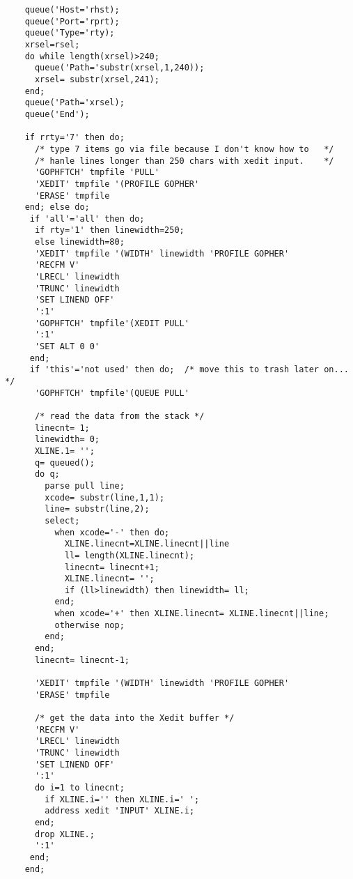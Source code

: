 \begin{verbatim}
    queue('Host='rhst);
    queue('Port='rprt);
    queue('Type='rty);
    xrsel=rsel;
    do while length(xrsel)>240;
      queue('Path='substr(xrsel,1,240));
      xrsel= substr(xrsel,241);
    end;
    queue('Path='xrsel);
    queue('End');

    if rrty='7' then do;
      /* type 7 items go via file because I don't know how to   */
      /* hanle lines longer than 250 chars with xedit input.    */
      'GOPHFTCH' tmpfile 'PULL'
      'XEDIT' tmpfile '(PROFILE GOPHER'
      'ERASE' tmpfile
    end; else do;
     if 'all'='all' then do;
      if rty='1' then linewidth=250;
      else linewidth=80;
      'XEDIT' tmpfile '(WIDTH' linewidth 'PROFILE GOPHER'
      'RECFM V'
      'LRECL' linewidth
      'TRUNC' linewidth
      'SET LINEND OFF'
      ':1'
      'GOPHFTCH' tmpfile'(XEDIT PULL'
      ':1'
      'SET ALT 0 0'
     end;
     if 'this'='not used' then do;  /* move this to trash later on... */
      'GOPHFTCH' tmpfile'(QUEUE PULL'

      /* read the data from the stack */
      linecnt= 1;
      linewidth= 0;
      XLINE.1= '';
      q= queued();
      do q;
        parse pull line;
        xcode= substr(line,1,1);
        line= substr(line,2);
        select;
          when xcode='-' then do;
            XLINE.linecnt=XLINE.linecnt||line
            ll= length(XLINE.linecnt);
            linecnt= linecnt+1;
            XLINE.linecnt= '';
            if (ll>linewidth) then linewidth= ll;
          end;
          when xcode='+' then XLINE.linecnt= XLINE.linecnt||line;
          otherwise nop;
        end;
      end;
      linecnt= linecnt-1;

      'XEDIT' tmpfile '(WIDTH' linewidth 'PROFILE GOPHER'
      'ERASE' tmpfile

      /* get the data into the Xedit buffer */
      'RECFM V'
      'LRECL' linewidth
      'TRUNC' linewidth
      'SET LINEND OFF'
      ':1'
      do i=1 to linecnt;
        if XLINE.i='' then XLINE.i=' ';
        address xedit 'INPUT' XLINE.i;
      end;
      drop XLINE.;
      ':1'
     end;
    end;


\end{verbatim}
